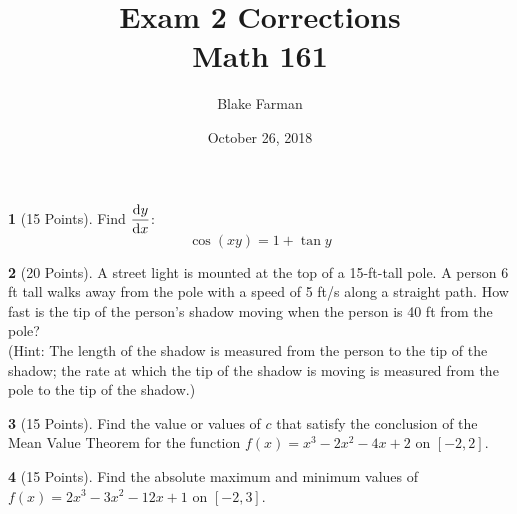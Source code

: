 \documentclass[12pt]{amsart}
\author{Blake Farman}
\title[Exam 2 Corrections]{Exam 2 Corrections\\Math 161}
\date{October 26, 2018}
\begin{document}
\maketitle

\makenameslot

\theoremstyle{definition}
\newtheorem{thm}{}
\renewcommand{\qedsymbol}{}

\begin{thm}[15 Points]
  Find \(\dfrac{\dif{y}}{\dif{x}}\):
  \[\cos(xy)=1+\tan y\]
\end{thm}

\newpage

\begin{thm}[20 Points]
  A street light is mounted at the top of a 15-ft-tall pole.
  A person 6 ft tall walks away from the pole with a speed of 5 ft/s along a straight path.
  How fast is the tip of the person's shadow moving when the person is 40 ft from the pole?\\
  (Hint: The length of the shadow is measured from the person to the tip of the shadow; the rate at which the tip of the shadow is moving is measured from the pole to the tip of the shadow.)
\end{thm}

\vspace{3in}

\begin{thm}[15 Points]
  Find the value or values of $c$ that satisfy the conclusion of the Mean Value Theorem for the function $f(x)=x^3 - 2x^2 -4x + 2$ on $[-2,2]$.
\end{thm}

\newpage

\begin{thm}[15 Points]
  Find the absolute maximum and minimum values of $f(x)=2x^3 - 3x^2 -12x + 1$ on $[-2,3]$.
\end{thm}
\end{document}
